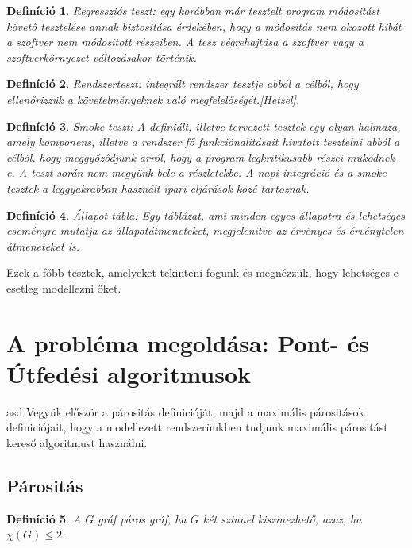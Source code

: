 \documentclass[12pt]{article}
\newtheorem{defin}{Definíció}[section]
\begin{document}
\begin{defin}
Regressziós teszt: egy korábban már tesztelt program módositást követő tesztelése annak biztositása érdekében, hogy a módositás nem okozott hibát a szoftver nem módositott részeiben. A tesz végrehajtása a szoftver vagy a szoftverkörnyezet változásakor történik. ~\cite{htb:masterfield}
\end{defin}

\begin{defin}
Rendszerteszt: integrált rendszer tesztje abból a célból, hogy ellenőrizzük a követelményeknek való megfelelőségét.[Hetzel]. ~\cite{htb:masterfield}
\end{defin}

\begin{defin}
Smoke teszt: A definiált, illetve tervezett tesztek egy olyan halmaza, amely komponens, illetve a rendszer fő funkciónalitásait hivatott tesztelni abból a célból, hogy meggyőződjünk arról, hogy a program legkritikusabb részei müködnek-e. A teszt során nem megyünk bele a részletekbe. A napi integráció és a smoke tesztek a leggyakrabban használt ipari eljárások közé tartoznak. ~\cite{htb:masterfield}
\end{defin}

\begin{defin}
Állapot-tábla: Egy táblázat, ami minden egyes állapotra és lehetséges eseményre mutatja az állapotátmeneteket, megjelenitve az érvényes és érvénytelen átmeneteket is. ~\cite{htb:masterfield}
\end{defin}

Ezek a főbb tesztek, amelyeket tekinteni fogunk és megnézzük, hogy lehetséges-e esetleg modellezni őket.\\
\pagebreak

\section{A probléma megoldása: Pont- és Útfedési algoritmusok}

asd
Vegyük először a párositás definicióját, majd a maximális párositások definiciójait, hogy a modellezett rendszerünkben tudjunk maximális párositást kereső algoritmust használni.

\subsection{Párositás}

\begin{defin}
A $G$ gráf páros gráf, ha $G$ két szinnel kiszinezhető, azaz, ha $\chi(G) \leq 2$. ~\cite{szam:Fleiner}
\end{defin}
\end{document}
